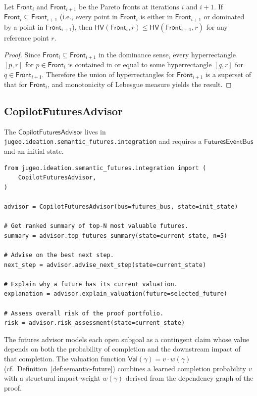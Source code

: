 \documentclass[11pt]{article}
\newcommand{\Front}{\mathsf{Front}}
\newcommand{\Valuation}{\mathsf{Val}}
\begin{document}
\begin{theorem}\label{thm:opt-mono}
Let $\Front_i$ and $\Front_{i+1}$ be the Pareto fronts at
iterations $i$ and $i+1$.  If
$\Front_i \subseteq \Front_{i+1}$ (i.e., every point in
$\Front_i$ is either in $\Front_{i+1}$ or dominated by a point
in $\Front_{i+1}$), then
$\mathsf{HV}(\Front_i, r) \leq \mathsf{HV}(\Front_{i+1}, r)$
for any reference point $r$.
\end{theorem}
\begin{proof}
Since $\Front_i \subseteq \Front_{i+1}$ in the dominance
sense, every hyperrectangle $[p, r]$ for $p \in \Front_i$ is
contained in or equal to some hyperrectangle $[q, r]$ for
$q \in \Front_{i+1}$.  Therefore the union of hyperrectangles
for $\Front_{i+1}$ is a superset of that for $\Front_i$, and
monotonicity of Lebesgue measure yields the result.
\end{proof}

\subsection{CopilotFuturesAdvisor}\label{sec:futures-advisor}

The $\mathsf{CopilotFuturesAdvisor}$ lives in
\texttt{jugeo.ideation.semantic\_futures.integration} and
requires a $\mathsf{FuturesEventBus}$ and an initial state.

\begin{lstlisting}[style=jugeo-python,caption={CopilotFuturesAdvisor core interface.},label={lst:futures-advisor}]
from jugeo.ideation.semantic_futures.integration import (
    CopilotFuturesAdvisor,
)

advisor = CopilotFuturesAdvisor(bus=futures_bus, state=init_state)

# Get ranked summary of top-N most valuable futures.
summary = advisor.top_futures_summary(state=current_state, n=5)

# Advise on the best next step.
next_step = advisor.advise_next_step(state=current_state)

# Explain why a future has its current valuation.
explanation = advisor.explain_valuation(future=selected_future)

# Assess overall risk of the proof portfolio.
risk = advisor.risk_assessment(state=current_state)
\end{lstlisting}

The futures advisor models each open subgoal as a contingent
claim whose value depends on both the probability of completion
and the downstream impact of that completion.  The valuation
function $\Valuation(\gamma) = v \cdot w(\gamma)$ (cf.\
Definition~\ref{def:semantic-future}) combines a
learned completion probability $v$ with a structural impact
weight $w(\gamma)$ derived from the dependency graph of the
proof.
\end{document}
